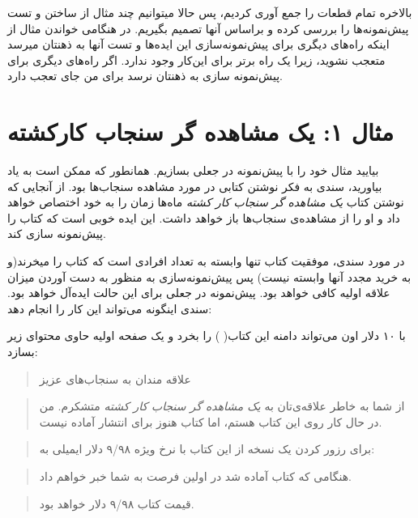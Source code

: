 بالاخره تمام قطعات را جمع آوری کردیم، پس حالا میتوانیم چند مثال از ساختن
و تست پیش‌نمونه‌ها را بررسی کرده و براساس آنها تصمیم بگیریم. در هنگامی
خواندن مثال از اینکه راه‌های دیگری برای پیش‌نمونه‌سازی این ایده‌ها و تست
آنها به ذهنتان میرسد متعجب نشوید، زیرا یک راه برتر برای این‌کار وجود
ندارد. اگر راه‌های دیگری برای پیش‌نمونه سازی به ذهنتان نرسد برای من جای
تعجب دارد.

\section{مثال ۱: یک مشاهده گر سنجاب
کارکشته}\label{ux645ux62bux627ux644-ux6ccux6a9-ux645ux634ux627ux647ux62fux647-ux6afux631-ux633ux646ux62cux627ux628-ux6a9ux627ux631ux6a9ux634ux62aux647}

بیایید مثال خود را با پیش‌نمونه در جعلی بسازیم. همانطور که ممکن است به
یاد بیاورید، سندی به فکر نوشتن کتابی در مورد مشاهده سنجاب‌ها بود. از
آنجایی که نوشتن کتاب \emph{یک مشاهده گر سنجاب کار کشته} ماه‌ها زمان را
به خود اختصاص خواهد داد و او را از مشاهده‌ی سنجاب‌ها باز خواهد داشت. این
ایده خوبی است که کتاب را پیش‌نمونه سازی کند.

در مورد سندی، موفقیت کتاب تنها وابسته به تعداد افرادی است که کتاب را
میخرند(و به خرید مجدد آنها وابسته نیست) پس پیش‌نمونه‌سازی به منظور به
دست آوردن میزان علاقه اولیه کافی خواهد بود. پیش‌نمونه در جعلی برای این
حالت ایده‌آل خواهد بود. سندی اینگونه می‌تواند این کار را انجام دهد:

با ۱۰ دلار اون می‌تواند دامنه این کتاب(
 ) را بخرد و یک صفحه اولیه حاوی
محتوای زیر بسازد:

\begin{quote}
علاقه مندان به سنجاب‌های عزیز
\end{quote}

\begin{quote}
از شما به خاطر علاقه‌ی‌تان به \emph{یک مشاهده گر سنجاب کار کشته} متشکرم.
من در حال کار روی این کتاب هستم، اما کتاب هنوز برای انتشار آماده نیست.
\end{quote}

\begin{quote}
برای رزور کردن یک نسخه از این کتاب با نرخ ویژه ۹/۹۸ دلار ایمیلی به:
\end{quote}

\begin{quote}
هنگامی که کتاب آماده شد در اولین فرصت به شما خبر خواهم داد.
\end{quote}

\begin{quote}
قیمت کتاب ۹/۹۸ دلار خواهد بود.
\end{quote}

